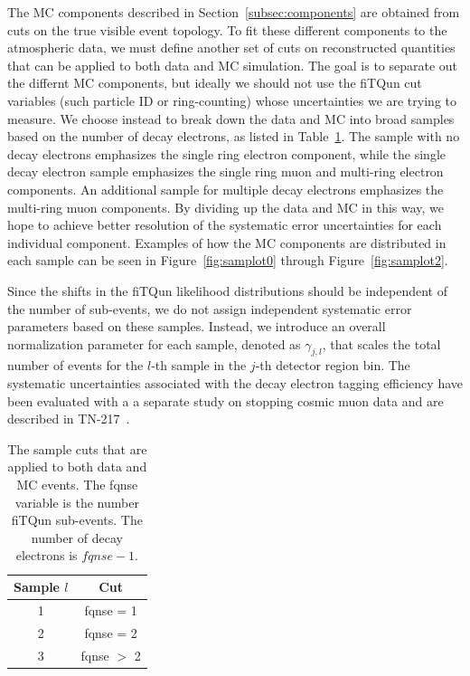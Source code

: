 The MC components described in Section~\ref{subsec:components} are obtained from
cuts on the true visible event topology.  To fit these different components to
the atmospheric data, we must define another set of cuts on reconstructed quantities
that can be applied to both data and MC simulation.  The goal is to 
separate out the differnt MC components, but ideally we should not
use the fiTQun cut variables (such particle ID or ring-counting) whose
uncertainties we are trying to measure.  We choose instead to break down the
data and MC into broad samples based on the number of decay electrons, as listed
in Table~\ref{tab:samples}.  The sample with no decay electrons emphasizes the
single ring electron component, while the single decay electron sample
emphasizes the single ring muon and multi-ring electron components. An
additional sample for multiple decay electrons emphasizes the multi-ring muon
components.  By dividing up the data and MC in this way, we hope to achieve better
resolution of the systematic error uncertainties for each individual component.
Examples of how the MC components are distributed in each sample can be seen in
Figure~\ref{fig:samplot0} through Figure~\ref{fig:samplot2}.

Since the shifts in the fiTQun likelihood distributions should be independent of the
number of sub-events, we do not assign independent systematic error parameters
based on these samples. Instead, we introduce an overall normalization
parameter for each sample, denoted as $\gamma_{j,l}$, that scales the total
number of events for the $l$-th sample in the $j$-th detector region bin.  The systematic 
uncertainties associated with the decay electron tagging efficiency have been
evaluated with a a separate study on stopping cosmic muon data and are
described in TN-217~\cite{tn317}.

\begin{table}
  \centering
  \begin{tabular}{c | c}
    \hline\hline
    Sample $l$ & Cut \\
    \hline
    1 & fqnse = 1 \\
    2 & fqnse = 2 \\
    3 & fqnse $>$ 2 \\
    \hline\hline
  \end{tabular}
  \caption{The sample cuts that are applied to both data and MC events. The
  fqnse variable is the number fiTQun sub-events. The number of decay electrons
  is $fqnse -1$. }
  \label{tab:samples}
\end{table}


